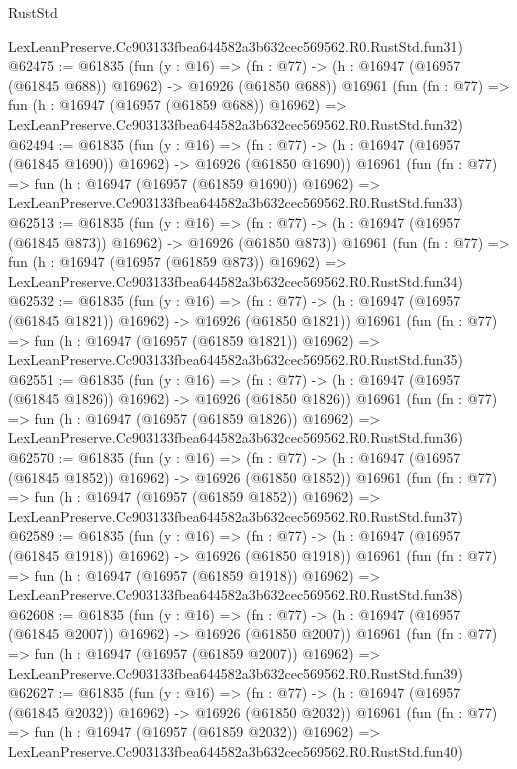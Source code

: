 \begin{lexlean}{RustStd}
\begin{coremodule}
    LexLeanPreserve.Cc903133fbea644582a3b632cec569562.R0.RustStd.fun31)
@62475 := @61835
    (fun (y : @16) =>
    (fn : @77) -> (h : @16947 (@16957 (@61845 @688)) @16962) -> @16926 (@61850 @688))
    @16961
    (fun (fn : @77) =>
    fun (h : @16947 (@16957 (@61859 @688)) @16962) =>
    LexLeanPreserve.Cc903133fbea644582a3b632cec569562.R0.RustStd.fun32)
@62494 := @61835
    (fun (y : @16) =>
    (fn : @77) -> (h : @16947 (@16957 (@61845 @1690)) @16962) -> @16926 (@61850 @1690))
    @16961
    (fun (fn : @77) =>
    fun (h : @16947 (@16957 (@61859 @1690)) @16962) =>
    LexLeanPreserve.Cc903133fbea644582a3b632cec569562.R0.RustStd.fun33)
@62513 := @61835
    (fun (y : @16) =>
    (fn : @77) -> (h : @16947 (@16957 (@61845 @873)) @16962) -> @16926 (@61850 @873))
    @16961
    (fun (fn : @77) =>
    fun (h : @16947 (@16957 (@61859 @873)) @16962) =>
    LexLeanPreserve.Cc903133fbea644582a3b632cec569562.R0.RustStd.fun34)
@62532 := @61835
    (fun (y : @16) =>
    (fn : @77) -> (h : @16947 (@16957 (@61845 @1821)) @16962) -> @16926 (@61850 @1821))
    @16961
    (fun (fn : @77) =>
    fun (h : @16947 (@16957 (@61859 @1821)) @16962) =>
    LexLeanPreserve.Cc903133fbea644582a3b632cec569562.R0.RustStd.fun35)
@62551 := @61835
    (fun (y : @16) =>
    (fn : @77) -> (h : @16947 (@16957 (@61845 @1826)) @16962) -> @16926 (@61850 @1826))
    @16961
    (fun (fn : @77) =>
    fun (h : @16947 (@16957 (@61859 @1826)) @16962) =>
    LexLeanPreserve.Cc903133fbea644582a3b632cec569562.R0.RustStd.fun36)
@62570 := @61835
    (fun (y : @16) =>
    (fn : @77) -> (h : @16947 (@16957 (@61845 @1852)) @16962) -> @16926 (@61850 @1852))
    @16961
    (fun (fn : @77) =>
    fun (h : @16947 (@16957 (@61859 @1852)) @16962) =>
    LexLeanPreserve.Cc903133fbea644582a3b632cec569562.R0.RustStd.fun37)
@62589 := @61835
    (fun (y : @16) =>
    (fn : @77) -> (h : @16947 (@16957 (@61845 @1918)) @16962) -> @16926 (@61850 @1918))
    @16961
    (fun (fn : @77) =>
    fun (h : @16947 (@16957 (@61859 @1918)) @16962) =>
    LexLeanPreserve.Cc903133fbea644582a3b632cec569562.R0.RustStd.fun38)
@62608 := @61835
    (fun (y : @16) =>
    (fn : @77) -> (h : @16947 (@16957 (@61845 @2007)) @16962) -> @16926 (@61850 @2007))
    @16961
    (fun (fn : @77) =>
    fun (h : @16947 (@16957 (@61859 @2007)) @16962) =>
    LexLeanPreserve.Cc903133fbea644582a3b632cec569562.R0.RustStd.fun39)
@62627 := @61835
    (fun (y : @16) =>
    (fn : @77) -> (h : @16947 (@16957 (@61845 @2032)) @16962) -> @16926 (@61850 @2032))
    @16961
    (fun (fn : @77) =>
    fun (h : @16947 (@16957 (@61859 @2032)) @16962) =>
    LexLeanPreserve.Cc903133fbea644582a3b632cec569562.R0.RustStd.fun40)

\end{coremodule}
\end{lexlean}
